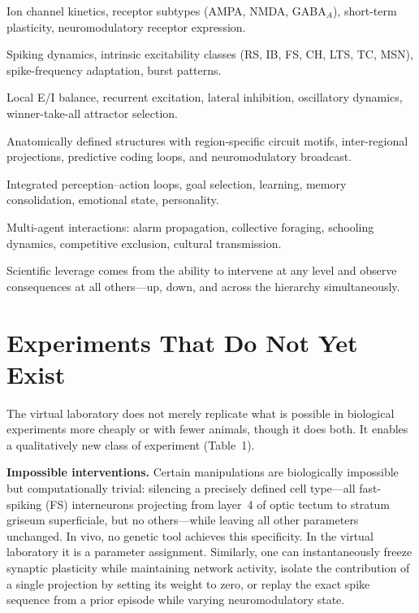 \documentclass[12pt,a4paper]{article}
\begin{document}
\begin{description}[leftmargin=0em, topsep=4pt, itemsep=4pt,
                    font=\normalfont\bfseries]
  \item[Level 1 --- Synaptic/molecular.]
    Ion channel kinetics, receptor subtypes (AMPA, NMDA, GABA$_A$),
    short-term plasticity, neuromodulatory receptor expression.
  \item[Level 2 --- Single neuron.]
    Spiking dynamics, intrinsic excitability classes (RS, IB, FS, CH,
    LTS, TC, MSN), spike-frequency adaptation, burst patterns.
  \item[Level 3 --- Circuit/microcircuit.]
    Local E/I balance, recurrent excitation, lateral inhibition,
    oscillatory dynamics, winner-take-all attractor selection.
  \item[Level 4 --- Brain region/module.]
    Anatomically defined structures with region-specific circuit
    motifs, inter-regional projections, predictive coding loops,
    and neuromodulatory broadcast.
  \item[Level 5 --- Whole-brain / individual behaviour.]
    Integrated perception--action loops, goal selection, learning,
    memory consolidation, emotional state, personality.
  \item[Level 6 --- Social/population.]
    Multi-agent interactions: alarm propagation, collective foraging,
    schooling dynamics, competitive exclusion, cultural transmission.
\end{description}

Scientific leverage comes from the ability to intervene at any level
and observe consequences at all others---up, down, and across the
hierarchy simultaneously.


\section*{Experiments That Do Not Yet Exist}

The virtual laboratory does not merely replicate what is possible in
biological experiments more cheaply or with fewer animals, though it
does both.
It enables a qualitatively new class of experiment (Table~1).

\textbf{Impossible interventions.}
Certain manipulations are biologically impossible but computationally
trivial: silencing a precisely defined cell type---all fast-spiking
(FS) interneurons projecting from layer~4 of optic tectum to stratum
griseum superficiale, but no others---while leaving all other
parameters unchanged.
In vivo, no genetic tool achieves this specificity.
In the virtual laboratory it is a parameter assignment.
Similarly, one can instantaneously freeze synaptic plasticity while
maintaining network activity, isolate the contribution of a single
projection by setting its weight to zero, or replay the exact spike
sequence from a prior episode while varying neuromodulatory state.
\end{document}
